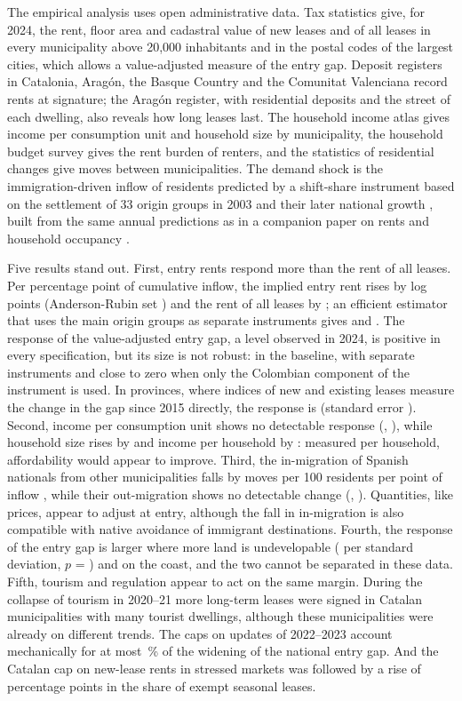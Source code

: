 \documentclass[11pt,a4paper]{article}
\begin{document}
The empirical analysis uses open administrative data. Tax statistics give, for 2024, the rent, floor area and cadastral value of new leases and of all leases in every municipality above 20,000 inhabitants and in the postal codes of the largest cities, which allows a value-adjusted measure of the entry gap. Deposit registers in Catalonia, Aragón, the Basque Country and the Comunitat Valenciana record rents at signature; the Aragón register, with \araDep{} residential deposits and the street of each dwelling, also reveals how long leases last. The household income atlas gives income per consumption unit and household size by municipality, the household budget survey gives the rent burden of renters, and the statistics of residential changes give moves between municipalities. The demand shock is the immigration-driven inflow of residents predicted by a shift-share instrument based on the settlement of 33 origin groups in 2003 and their later national growth \citep{saiz2007,goldsmith2020,borusyak2022}, built from the same annual predictions as in a companion paper on rents and household occupancy \citep{fernandez2026}.

Five results stand out. First, entry rents respond more than the rent of all leases. Per percentage point of cumulative inflow, the implied entry rent rises by \bEntry{} log points (Anderson-Rubin set \bEntryAR) and the rent of all leases by \bStock{} \bStockAR; an efficient estimator that uses the main origin groups as separate instruments gives \gmmEntry{} and \gmmStock. The response of the value-adjusted entry gap, a level observed in 2024, is positive in every specification, but its size is not robust: \bGap{} \bGapAR{} in the baseline, \gmmGap{} with separate instruments and close to zero when only the Colombian component of the instrument is used. In provinces, where indices of new and existing leases measure the change in the gap since 2015 directly, the response is \pvLev{} (standard error \pvLevSe). Second, income per consumption unit shows no detectable response (\bUc, \bUcAR), while household size rises by \bHs{} \bHsAR{} and income per household by \bHh: measured per household, affordability would appear to improve. Third, the in-migration of Spanish nationals from other municipalities falls by \flInSpAbs{} moves per 100 residents per point of inflow \flInSpAR, while their out-migration shows no detectable change (\flOutSp, \flOutSpAR). Quantities, like prices, appear to adjust at entry, although the fall in in-migration is also compatible with native avoidance of immigrant destinations. Fourth, the response of the entry gap is larger where more land is undevelopable (\rigB{} per standard deviation, $p$ = \rigP) and on the coast, and the two cannot be separated in these data. Fifth, tourism and regulation appear to act on the same margin. During the collapse of tourism in 2020--21 more long-term leases were signed in Catalan municipalities with many tourist dwellings, although these municipalities were already on different trends. The caps on updates of 2022--2023 account mechanically for at most \capShare\,\% of the widening of the national entry gap. And the Catalan cap on new-lease rents in stressed markets was followed by a rise of \seasPostOne{} percentage points in the share of exempt seasonal leases.
\end{document}
